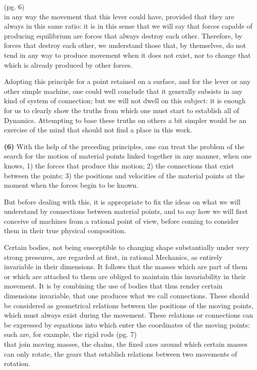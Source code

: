 \documentclass{book}
\begin{document}
\newpage
(pg. 6)\\
in any way the movement that this lever could have, provided that they are always in this same ratio: it is in this sense that we will say that forces capable of producing equilibrium are forces that always destroy each other.
Therefore, by forces that destroy each other, we understand those that, by themselves, do not tend in any way to produce movement when it does not exist, nor to change that which is already produced by other forces.

Adopting this principle for a point retained on a surface, and for the lever or any other simple machine, one could well conclude that it generally subsists in any kind of system of connection; but we will not dwell on this subject: it is enough for us to clearly show the truths from which one must start to establish all of Dynamics. Attempting to base these truths on others a bit simpler would be an exercise of the mind that should not find a place in this work.

\textbf{(6)} With the help of the preceding principles, one can treat the problem of the search for the motion of material points linked together in any manner, when one knows, 1) the forces that produce this motion; 2) the connections that exist between the points; 3) the positions and velocities of the material points at the moment when the forces begin to be known.

But before dealing with this, it is appropriate to fix the ideas on what we will understand by connections between material points, and to say how we will first conceive of machines from a rational point of view, before coming to consider them in their true physical composition.

Certain bodies, not being susceptible to changing shape substantially under very strong pressures, are regarded at first, in rational Mechanics, as entirely invariable in their dimensions. It follows that the masses which are part of them or which are attached to them are obliged to maintain this invariability in their movement. It is by combining the use of bodies that thus render certain dimensions invariable, that one produces what we call connections. These should be considered as geometrical relations between the positions of the moving points, which must always exist during the movement. These relations or connections can be expressed by equations into which enter the coordinates of the moving points: such are, for example, the rigid rods 
\newpage
(pg. 7) \\
that join moving masses, the chains, the fixed axes around which certain masses can only rotate, the gears that establish relations between two movements of rotation.
\end{document}
